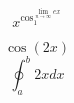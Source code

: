 \documentclass[12pt,a4paper]{article}
\begin{document}
$$
x^{\cos_{1}^{\lim_{n \to \infty} e     x}}
$$

$$ \cos(2x) $$
$$ \oint_a^b {2x} dx $$
\end{document}
